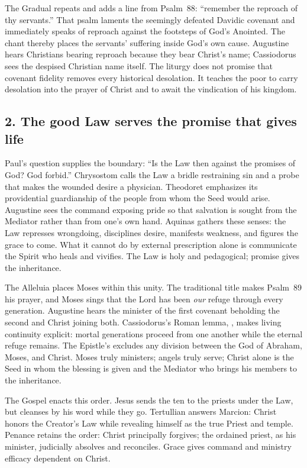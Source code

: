The Gradual repeats  and adds a line from Psalm~88: ``remember
the reproach of thy servants.'' That psalm laments the seemingly defeated
Davidic covenant and immediately speaks of reproach against the footsteps of
God's Anointed. The chant thereby places the servants' suffering inside God's
own cause. Augustine hears Christians bearing reproach because they bear
Christ's name; Cassiodorus sees the despised Christian name itself. The liturgy
does not promise that covenant fidelity removes every historical desolation.
It teaches the poor to carry desolation into the prayer of Christ and to await
the vindication of his kingdom.

\subsection*{2. The good Law serves the promise that gives life\enspace{}}

Paul's question supplies the boundary: ``Is the Law then against the promises
of God? God forbid.'' Chrysostom calls the Law a bridle restraining sin and a
probe that makes the wounded desire a physician. Theodoret emphasizes its
providential guardianship of the people from whom the Seed would arise.
Augustine sees the command exposing pride so that salvation is sought from the
Mediator rather than from one's own hand. Aquinas gathers these senses: the
Law represses wrongdoing, disciplines desire, manifests weakness, and figures
the grace to come. What it cannot do by external prescription alone is
communicate the Spirit who heals and vivifies. The Law is holy and
pedagogical; promise gives the inheritance.

The Alleluia places Moses within this unity. The traditional title makes
Psalm~89 his prayer, and Moses sings that the Lord has been \emph{our} refuge
through every generation. Augustine hears the minister of the first covenant
beholding the second and Christ joining both. Cassiodorus's Roman lemma,
, makes living continuity explicit: mortal
generations proceed from one another while the eternal refuge remains. The
Epistle's  excludes any division between the God of
Abraham, Moses, and Christ. Moses truly ministers; angels truly serve; Christ
alone is the Seed in whom the blessing is given and the Mediator who brings
his members to the inheritance.

The Gospel enacts this order. Jesus sends the ten to the priests under the
Law, but cleanses by his word while they go. Tertullian answers Marcion:
Christ honors the Creator's Law while revealing himself as the true Priest
and temple. Penance retains the order: Christ principally forgives; the
ordained priest, as his minister, judicially absolves and reconciles. Grace
gives command and ministry efficacy dependent on Christ.

